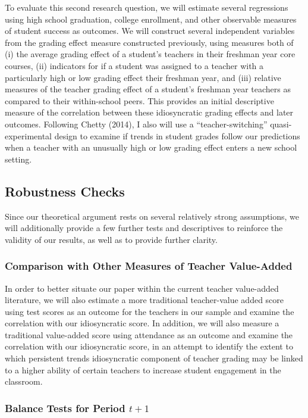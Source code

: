 \documentclass{article}
\begin{document}
To evaluate this second research question, we will estimate several regressions using high school graduation, college enrollment, and other observable measures of student success as outcomes. We will construct several independent variables from the grading effect measure constructed previously, using measures both of (i) the average grading effect of a student's teachers in their freshman year core courses, (ii) indicators for if a student was assigned to a teacher with a particularly high or low grading effect their freshman year, and (iii) relative measures of the teacher grading effect of a student’s freshman year teachers as compared to their within-school peers. This provides an initial descriptive measure of the correlation between these idiosyncratic grading effects and later outcomes. Following Chetty (2014), I also will use a ``teacher-switching'' quasi-experimental design to examine if trends in student grades follow our predictions when a teacher with an unusually high or low grading effect enters a new school setting.

\subsection*{Robustness Checks}

Since our theoretical argument rests on several relatively strong assumptions, we will additionally provide a few further tests and descriptives to reinforce the validity of our results, as well as to provide further clarity. \\

\subsubsection*{Comparison with Other Measures of Teacher Value-Added}

In order to better situate our paper within the current teacher value-added literature, we will also estimate a more traditional teacher-value added score using test scores as an outcome for the teachers in our sample and examine the correlation with our idiosyncratic score. In addition, we will also measure a traditional value-added score using attendance as an outcome and examine the correlation with our idiosyncratic score, in an attempt to identify the extent to which persistent trends idiosyncratic component of teacher grading may be linked to a higher ability of certain teachers to increase student engagement in the classroom. 

\subsubsection*{Balance Tests for Period $t+1$}
\end{document}

